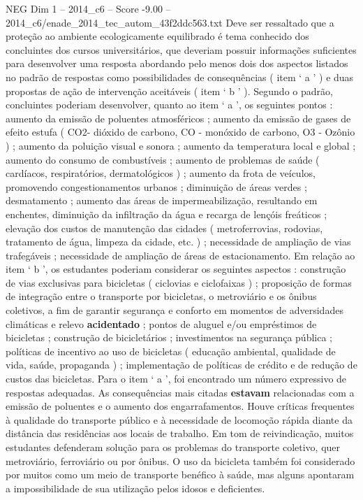 \begin{textsample}{NEG Dim 1 – 2014\_c6 – Score -9.00 – 2014\_c6/enade\_2014\_tec\_autom\_43f2ddc563.txt}
Deve ser ressaltado que a proteção ao ambiente ecologicamente equilibrado é tema conhecido dos concluintes dos cursos universitários, que deveriam possuir informações suficientes para desenvolver uma resposta abordando pelo menos dois dos aspectos listados no padrão de respostas como possibilidades de consequências ( item ‘ a ’ ) e duas propostas de ação de intervenção aceitáveis ( item ‘ b ’ ).
Segundo o padrão, concluintes poderiam desenvolver, quanto ao item ‘ a ’, os seguintes pontos : aumento da emissão de poluentes atmosféricos ; aumento da emissão de gases de efeito estufa ( CO2- dióxido de carbono, CO - monóxido de carbono, O3 - Ozônio ) ; aumento da poluição visual e sonora ; aumento da temperatura local e global ; aumento do consumo de combustíveis ; aumento de problemas de saúde ( cardíacos, respiratórios, dermatológicos ) ; aumento da frota de veículos, promovendo congestionamentos urbanos ; diminuição de áreas verdes ; desmatamento ; aumento das áreas de impermeabilização, resultando em enchentes, diminuição da infiltração da água e recarga de lençóis freáticos ; elevação dos custos de manutenção das cidades ( metroferrovias, rodovias, tratamento de água, limpeza da cidade, etc. ) ; necessidade de ampliação de vias trafegáveis ; necessidade de ampliação de áreas de estacionamento.
Em relação ao item ‘ b ’, os estudantes poderiam considerar os seguintes aspectos : construção de vias exclusivas para bicicletas ( ciclovias e ciclofaixas ) ; proposição de formas de integração entre o transporte por bicicletas, o metroviário e os ônibus coletivos, a fim de garantir segurança e conforto em momentos de adversidades climáticas e relevo \textbf{acidentado} ; pontos de aluguel e/ou empréstimos de bicicletas ; construção de bicicletários ; investimentos na segurança pública ; políticas de incentivo ao uso de bicicletas ( educação ambiental, qualidade de vida, saúde, propaganda ) ; implementação de políticas de crédito e de redução de custos das bicicletas.
Para o item ‘ a ’, foi encontrado um número expressivo de respostas adequadas.
As consequências mais citadas \textbf{estavam} relacionadas com a emissão de poluentes e o aumento dos engarrafamentos.
Houve críticas frequentes à qualidade do transporte público e à necessidade de locomoção rápida diante da distância das residências aos locais de trabalho.
Em tom de reivindicação, muitos estudantes defenderam solução para os problemas do transporte coletivo, quer metroviário, ferroviário ou por ônibus.
O uso da bicicleta também foi considerado por muitos como um meio de transporte benéfico à saúde, mas alguns apontaram a impossibilidade de sua utilização pelos idosos e deficientes.

\end{textsample}
